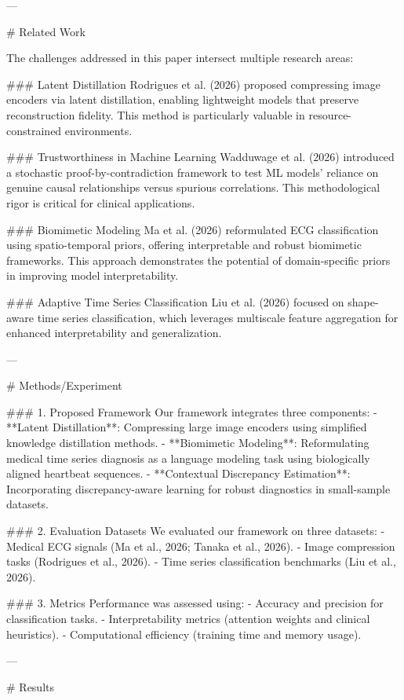 ---

# Related Work

The challenges addressed in this paper intersect multiple research areas:

### Latent Distillation
Rodrigues et al. (2026) proposed compressing image encoders via latent distillation, enabling lightweight models that preserve reconstruction fidelity. This method is particularly valuable in resource-constrained environments.

### Trustworthiness in Machine Learning
Wadduwage et al. (2026) introduced a stochastic proof-by-contradiction framework to test ML models' reliance on genuine causal relationships versus spurious correlations. This methodological rigor is critical for clinical applications.

### Biomimetic Modeling
Ma et al. (2026) reformulated ECG classification using spatio-temporal priors, offering interpretable and robust biomimetic frameworks. This approach demonstrates the potential of domain-specific priors in improving model interpretability.

### Adaptive Time Series Classification
Liu et al. (2026) focused on shape-aware time series classification, which leverages multiscale feature aggregation for enhanced interpretability and generalization.

---

# Methods/Experiment

### 1. Proposed Framework
Our framework integrates three components:
- **Latent Distillation**: Compressing large image encoders using simplified knowledge distillation methods.
- **Biomimetic Modeling**: Reformulating medical time series diagnosis as a language modeling task using biologically aligned heartbeat sequences.
- **Contextual Discrepancy Estimation**: Incorporating discrepancy-aware learning for robust diagnostics in small-sample datasets.

### 2. Evaluation Datasets
We evaluated our framework on three datasets:
- Medical ECG signals (Ma et al., 2026; Tanaka et al., 2026).
- Image compression tasks (Rodrigues et al., 2026).
- Time series classification benchmarks (Liu et al., 2026).

### 3. Metrics
Performance was assessed using:
- Accuracy and precision for classification tasks.
- Interpretability metrics (attention weights and clinical heuristics).
- Computational efficiency (training time and memory usage).

---

# Results

